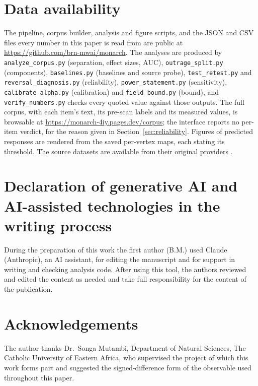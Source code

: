\documentclass[preprint,12pt]{elsarticle}
\newif\ifcoauthor
\begin{document}
\section*{Data availability}
\label{sec:availability}

The pipeline, corpus builder, analysis and figure scripts, and the JSON and CSV files every
number in this paper is read from are public at \url{https://github.com/brn-mwai/monarch}.
The analyses are produced by \texttt{analyze\_corpus.py} (separation, effect sizes, AUC),
\texttt{outrage\_split.py} (components), \texttt{baselines.py} (baselines and source probe),
\texttt{test\_retest.py} and \texttt{reversal\_diagnosis.py} (reliability),
\texttt{power\_statement.py} (sensitivity), \texttt{calibrate\_alpha.py} (calibration) and
\texttt{field\_bound.py} (bound), and \texttt{verify\_numbers.py} checks every quoted value
against those outputs. The full corpus, with each item's text, its pre-scan labels and its
measured values, is browsable at \url{https://monarch-4iy.pages.dev/corpus}; the interface
reports no per-item verdict, for the reason given in Section~\ref{sec:reliability}. Figures
of predicted responses are rendered from the saved per-vertex maps, each stating its
threshold. The source datasets are available from their original providers
\cite{ahmed2017,kiesel2019,potthast2018,pubmed}.

\section*{Declaration of generative AI and AI-assisted technologies in the writing process}

During the preparation of this work the first author (B.M.) used Claude (Anthropic), an AI
assistant, for editing the manuscript and for support in writing and checking analysis code.
After using this tool, the authors reviewed and edited the content as needed and take full
responsibility for the content of the publication.

\section*{Acknowledgements}

\ifcoauthor
The authors thank the Department of Natural Sciences, The Catholic University of Eastern
Africa, for supporting the project of which this work forms part.
\else
The author thanks Dr.\ Songa Mutambi, Department of Natural Sciences, The Catholic University
of Eastern Africa, who supervised the project of which this work forms part and suggested the
signed-difference form of the observable used throughout this paper.
\fi
\end{document}
